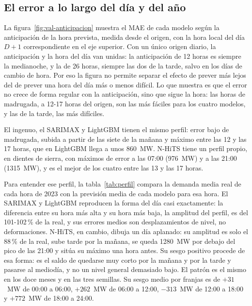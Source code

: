 \subsection{El error a lo largo del día y del año}\label{sec:val-perfil}

La figura~\ref{fig:val-anticipacion} muestra el MAE de cada modelo según la
anticipación de la hora prevista, medida desde el origen, con la hora local
del día $D+1$ correspondiente en el eje superior. Con un único origen diario,
la anticipación y la hora del día van unidas: la anticipación de 12 horas es
siempre la medianoche, y la de 26 horas, siempre las dos de la tarde, salvo
en los días de cambio de hora. Por eso la figura no permite separar el efecto
de prever más lejos del de prever una hora del día más o menos difícil. Lo que
muestra es que el error no crece de forma regular con la anticipación, sino
que sigue la hora: las horas de madrugada, a 12-17 horas del origen, son las
más fáciles para los cuatro modelos, y las de la tarde, las más difíciles.

El ingenuo, el SARIMAX y LightGBM tienen el mismo perfil: error bajo de
madrugada, subida a partir de las siete de la mañana y máximo entre las 12 y
las 17 horas, que en LightGBM llega a unos 860~MW. N-HiTS tiene un perfil
propio, en dientes de sierra, con máximos de error a las 07:00 (976~MW) y a
las 21:00 (1315~MW), y es el mejor de los cuatro entre las 13 y las 17 horas.

Para entender ese perfil, la tabla~\ref{tab:perfil} compara la demanda media
real de cada hora de 2023 con la previsión media de cada modelo para esa hora.
El SARIMAX y LightGBM reproducen la forma del día casi exactamente: la
diferencia entre su hora más alta y su hora más baja, la amplitud del perfil,
es del 101-102\,\% de la real, y sus errores medios son desplazamientos de
nivel, no deformaciones. N-HiTS, en cambio, dibuja un día aplanado: su
amplitud es solo el 88\,\% de la real, sube tarde por la mañana, se queda
1280~MW por debajo del pico de las 21:00 y sitúa su máximo una hora antes. Su
sesgo positivo procede de esa forma: es el saldo de quedarse muy corto por la
mañana y por la tarde y pasarse al mediodía, y no un nivel general demasiado
bajo. El patrón es el mismo en los doce meses y en las tres semillas. Su
sesgo medio por franjas es de $+31$~MW de 00:00 a 06:00, $+262$~MW de 06:00 a
12:00, $-313$~MW de 12:00 a 18:00 y $+772$~MW de 18:00 a 24:00.

